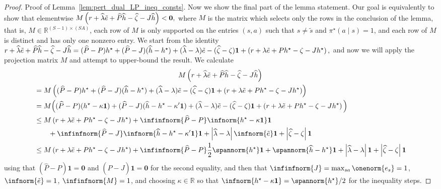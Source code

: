 \documentclass[mnsc,nonblindrev]{informs3}
\newcommand{\R}{\mathbb{R}}
\newcommand{\Phat}{\widehat{P}}
\newcommand{\one}{\mathbf{1}}
\newcommand{\pistar}{\pi^\star}
\newcommand{\hhat}{\widehat{h}}
\newcommand{\zero}{\mathbf{0}}
\newcommand{\zetahat}{\widehat{\zeta}}
\newcommand{\lambdahat}{\widehat{\lambda}}
\begin{document}
\begin{APPENDICES}
\begin{proof}{Proof of Lemma~\ref{lem:pert_dual_LP_ineq_consts}.}
Now we show the final part of the lemma statement.
Our goal is equivalently to show that elementwise
$
    M \left( r + \lambdahat \Tilde{e} + \Phat\hhat - \zetahat - J \hhat\right) < \zero,
$
where $M$ is the matrix which selects only the rows in the conclusion of the lemma, that is, $M \in \R^{(S-1) \times (SA)}$, each row of $M$ is only supported on the entries $(s,a)$ such that $s \neq \tilde{s}$ and $\pistar(a \mid s) = 1$, and each row of $M$ is distinct and has only one nonzero entry. 
We start from the identity
$
    r + \lambdahat \Tilde{e} + \Phat\hhat - \zetahat - J \hhat 
    = (\Phat - P)h^\star + (\Phat - J)(\hhat-h^\star) + (\lambdahat - \lambda)\Tilde{e} - (\zetahat-\zeta)\one + \left(r +  \lambda \Tilde{e} + Ph^\star - \zeta - J h^\star \right),
$
and now we will apply the projection matrix $M$ and attempt to upper-bound the result. We calculate
\begin{multline*}
    M \left( r + \lambdahat \Tilde{e} + \Phat\hhat - \zetahat - J \hhat \right) \\
    \begin{aligned}
        &= M \left( (\Phat - P)h^\star + (\Phat - J)(\hhat-h^\star) + (\lambdahat - \lambda)\Tilde{e} - (\zetahat-\zeta)\one + \left(r +  \lambda \Tilde{e} + Ph^\star - \zeta - J h^\star \right)\right) \\
        &= M \Big( (\Phat - P)(h^\star - \kappa \one) + (\Phat - J)(\hhat-h^\star - \kappa' \one) + (\lambdahat - \lambda)\Tilde{e} - (\zetahat-\zeta)\one 
         + \left(r +  \lambda \Tilde{e} + Ph^\star - \zeta - J h^\star \right)\Big) \\
        & \leq M \left(r +  \lambda \Tilde{e} + Ph^\star - \zeta - J h^\star \right) + \infinfnorm{\Phat - P }\infnorm{h^\star - \kappa \one}\one  \\
        & \qquad + \infinfnorm{\Phat - J} \infnorm{\hhat-h^\star - \kappa' \one}\one+ \left|\lambdahat - \lambda \right| \infnorm{\Tilde{e}} \one+ \left|\zetahat-\zeta\right|\one \\
        & \leq M \left(r +  \lambda \Tilde{e} + Ph^\star - \zeta - J h^\star \right) + \infinfnorm{\Phat - P } \frac{1}{2}\spannorm{h^\star}\one 
        + \spannorm{\hhat - h^\star}\one + \left|\lambdahat - \lambda \right|\one  + \left|\zetahat-\zeta\right|\one 
    \end{aligned}
\end{multline*}
using that $(\Phat -P) \one = \zero$ and $(\Phat - J) \one = \zero$ for the second equality, and then that $\infinfnorm{J} = \max_{s a} \onenorm{e_s} = 1$, $\infnorm{\Tilde{e}} = 1$, $\infinfnorm{M}= 1$, and choosing $\kappa \in \R$ so that $\infnorm{h^\star - \kappa \one}= \spannorm{h^\star}/2$ for the inequality steps.


\end{proof}
\end{APPENDICES}
\end{document}
